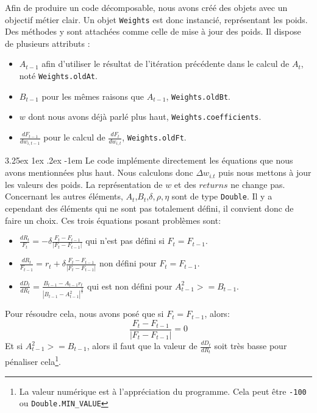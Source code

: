 \documentclass[a4paper, 11pt]{article}
\makeatletter
\renewcommand\paragraph{\@startsection{paragraph}{5}{\z@}%
  {3.25ex \@plus1ex \@minus.2ex}%
  {-1em}%
  {\normalfont\normalsize\bfseries}}
\makeatother
\begin{document}
Afin de produire un code décomposable, nous avons créé des objets avec un objectif métier clair. Un objet \texttt{Weights} est donc instancié, représentant
les poids. Des méthodes y sont attachées comme celle de mise à jour des poids. Il dispose de plusieurs attributs :
\begin{itemize}
 \item $A_{t-1}$ afin d'utiliser le résultat de l'itération précédente dans le calcul de $A_t$, noté \texttt{Weights.oldAt}.
 \item $B_{t-1}$ pour les mêmes raisons que $A_{t-1}$, \texttt{Weights.oldBt}.
 \item $w$ dont nous avons déjà parlé plus haut, \texttt{Weights.coefficients}.
 \item $\frac{dF_{t-1}}{dw_{i,t-1}}$ pour le calcul de $\frac{dF_{t}}{dw_{i,t}}$, \texttt{Weights.oldFt}.
\end{itemize}

\paragraph{}
Le code implémente directement les équations que nous avons mentionnées plus haut. Nous calculons donc $\Delta w_{i.t}$ puis
nous mettons à jour les valeurs des poids. La représentation de $w$ et des $returns$ ne change pas. Concernant les autres éléments, 
$A_t$,$B_t$,$\delta,\rho,\eta$ sont de type \texttt{Double}. Il y a cependant des éléments qui ne sont pas totalement défini, il convient donc de faire 
un choix. Ces trois équations posant problèmes sont:
\begin{itemize}
 \item $\frac{dR_t}{F_t} = -\delta \frac{F_t - F_{t-1}}{|F_t - F_{t-1}|}$ qui n'est pas défini si $F_t = F_{t-1}$.\\
 \item $\frac{dR_t}{F_{t-1}} = r_t + \delta \frac{F_t - F_{t-1}}{|F_t - F_{t-1}|}$ non défini pour $F_t = F_{t-1}$.\\
 \item $\frac{dD_t}{dR_t} = \frac{B_{t-1} - A_{t-1}r_t}{|B_{t-1} - A_{t-1}^2|^{\frac{3}{2}}}$ qui est non défini pour $A_{t-1}^2 >= B_{t-1}$.
\end{itemize}

Pour résoudre cela, nous avons posé que si $F_t = F_{t-1}$, alors: 
$$\frac{F_t - F_{t-1}}{|F_t - F_{t-1}|} = 0$$
Et si $A_{t-1}^2 >= B_{t-1}$, alors il faut que la valeur de $\frac{dD_t}{dR_t}$ soit très basse pour pénaliser cela\footnote{La valeur numérique est à 
l'appréciation du programme. Cela peut être \texttt{-100} ou \texttt{Double.MIN\_VALUE}}.
\end{document}
